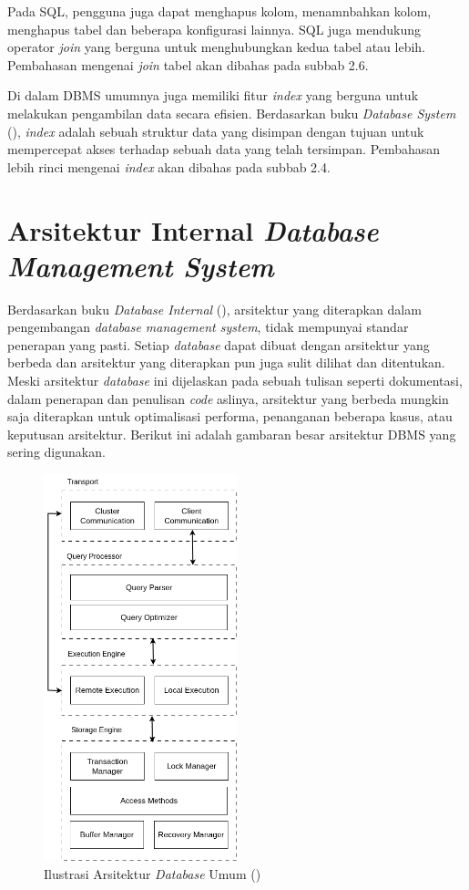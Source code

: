 Pada SQL, pengguna juga dapat menghapus kolom, menamnbahkan kolom, menghapus tabel dan beberapa
konfigurasi lainnya. SQL juga mendukung operator \emph{join} yang berguna untuk menghubungkan kedua tabel atau lebih. Pembahasan mengenai \emph{join} tabel akan dibahas pada subbab 2.6.

Di dalam DBMS umumnya juga memiliki fitur \emph{index} yang berguna untuk melakukan pengambilan data secara efisien. Berdasarkan buku
\emph{Database System} (\cite{databasesystem}), \emph{index} adalah sebuah struktur data yang disimpan dengan tujuan untuk mempercepat
akses terhadap sebuah data yang telah tersimpan. Pembahasan lebih rinci mengenai \emph{index} akan dibahas pada subbab 2.4.

\section{Arsitektur Internal \emph{Database Management System}}

Berdasarkan buku \emph{Database Internal} ({\cite{databaseinternal}}), 
arsitektur yang diterapkan dalam pengembangan \emph{database management system}, 
tidak mempunyai standar penerapan yang pasti. Setiap \emph{database} 
dapat dibuat dengan arsitektur yang berbeda dan arsitektur yang diterapkan pun juga 
sulit dilihat dan ditentukan. Meski arsitektur \emph{database}  ini dijelaskan pada sebuah tulisan seperti 
dokumentasi, dalam penerapan dan penulisan \emph{code} aslinya, arsitektur yang berbeda mungkin 
saja diterapkan untuk optimalisasi performa, penanganan beberapa kasus, atau 
keputusan arsitektur. Berikut ini adalah gambaran besar arsitektur 
DBMS yang sering digunakan.


\begin{figure}[H]
  \centering{}
	\includegraphics[width=0.5\textwidth]{gambar/bab2/dbms_achitecture}
  \caption{Ilustrasi Arsitektur \emph{Database}  Umum (\cite{databaseinternal})}
\end{figure}

